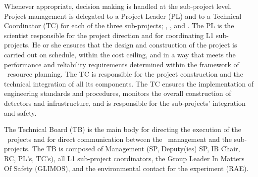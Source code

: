 Whenever appropriate, decision making is handled at the sub-project level. Project management is delegated to a Project Leader (PL) and to a Technical Coordinator (TC) for each of the three sub-projects; \DSks, \Urania, and \Aria. The PL is the scientist responsible for the project direction and for coordinating L1 sub-projects. He or she ensures that the design and construction of the project is carried out on schedule, within the cost ceiling, and in a way that meets the performance and reliability requirements determined within the framework of \GADMC\ resource planning. The TC is responsible for the project construction and the technical integration of all its components. The TC ensures the implementation of engineering standards and procedures, monitors the overall construction of detectors and infrastructure, and is responsible for the sub-projects' integration and safety.

The Technical Board (TB) is the main body for directing the execution of the \GADMC\ projects and for direct communication between the \GADMC\ management and the sub-projects. The TB is composed of Management (SP, Deputy(ies) SP, IB Chair, RC, PL's, TC's), all L1 sub-project coordinators, the Group Leader In Matters Of Safety (GLIMOS), and the environmental contact for the experiment (RAE).

